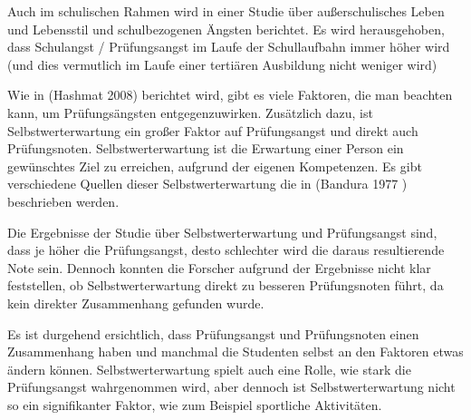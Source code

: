 \documentclass[11pt, a4paper]{article}
\begin{document}
	Auch im schulischen Rahmen wird in einer Studie über außerschulisches Leben und Lebensstil und schulbezogenen Ängsten berichtet. Es wird herausgehoben, dass Schulangst / Prüfungsangst im Laufe der Schullaufbahn immer höher wird (und dies vermutlich im Laufe einer tertiären Ausbildung nicht weniger wird) \cite{pixner2013prufungsangst}

	Wie in (Hashmat 2008) berichtet wird, gibt es viele Faktoren, die man beachten kann, um Prüfungsängsten entgegenzuwirken. Zusätzlich dazu, ist Selbstwerterwartung ein großer Faktor auf Prüfungsangst und direkt auch Prüfungsnoten. Selbstwerterwartung ist die Erwartung einer Person ein gewünschtes Ziel zu erreichen, aufgrund der eigenen Kompetenzen. Es gibt verschiedene Quellen dieser Selbstwerterwartung die in (Bandura 1977 \cite{bandura1977self}) beschrieben werden.

	Die Ergebnisse der Studie über Selbstwerterwartung und Prüfungsangst sind, dass je höher die Prüfungsangst, desto schlechter wird die daraus resultierende Note sein. Dennoch konnten die Forscher aufgrund der Ergebnisse nicht klar feststellen, ob Selbstwerterwartung direkt zu besseren Prüfungsnoten führt, da kein direkter Zusammenhang gefunden wurde. \cite{barrows2013anxiety}

	Es ist durgehend ersichtlich, dass Prüfungsangst und Prüfungsnoten einen Zusammenhang haben und manchmal die Studenten selbst an den Faktoren etwas ändern können. Selbstwerterwartung spielt auch eine Rolle, wie stark die Prüfungsangst wahrgenommen wird, aber dennoch ist Selbstwerterwartung nicht so ein signifikanter Faktor, wie zum Beispiel sportliche Aktivitäten. \cite{barrows2013anxiety} \cite{hashmat2008factors}
\newpage

{}

\end{document}
